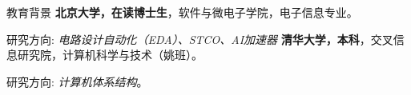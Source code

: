 \begin{rubric}{教育背景}
\entry*[2024 -- 至今]%
	\textbf{北京大学，在读博士生}，软件与微电子学院，电子信息专业。
	\par 研究方向: \emph{电路设计自动化（EDA）、STCO、AI加速器}
%
\entry*[2020 -- 2024]%
	\textbf{清华大学，本科}，交叉信息研究院，计算机科学与技术（姚班）。
	\par 研究方向: \emph{计算机体系结构}。
% 
\end{rubric}
